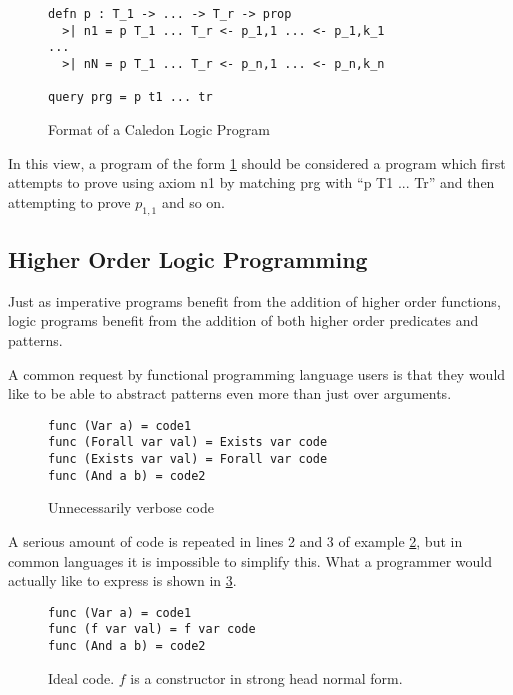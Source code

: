 \begin{figure}[H]
\begin{lstlisting}
defn p : T_1 -> ... -> T_r -> prop
  >| n1 = p T_1 ... T_r <- p_1,1 ... <- p_1,k_1
...
  >| nN = p T_1 ... T_r <- p_n,1 ... <- p_n,k_n

query prg = p t1 ... tr
\end{lstlisting}
\caption{Format of a Caledon Logic Program}
\label{code:format}
\end{figure}

In this view, a program of the form \ref{code:format}
should be considered a program which first attempts to prove using axiom n1 by matching prg with ``p T1 ... Tr'' and then
attempting to prove $p_{1,1}$ and so on.


\FloatBarrier
\subsection{Higher Order Logic Programming}

Just as imperative programs benefit from the addition of higher order functions, logic programs benefit from the addition of both
higher order predicates and patterns.  

A common request by functional programming language users is that they would like to be able to abstract patterns even more than just over
arguments.  

\begin{figure}[H]
\begin{lstlisting}
func (Var a) = code1
func (Forall var val) = Exists var code
func (Exists var val) = Forall var code
func (And a b) = code2
\end{lstlisting}
\caption{Unnecessarily verbose code}
\label{code:verbose}
\end{figure}

A serious amount of code is repeated in lines 2 and 3 of example \ref{code:verbose}, 
but in common languages it is impossible to simplify this.
What a programmer would actually like to express is shown in \ref{code:Fideal}.

\begin{figure}[H]
\begin{lstlisting}
func (Var a) = code1
func (f var val) = f var code
func (And a b) = code2
\end{lstlisting}
\caption{Ideal code. $f$ is a constructor in strong head normal form.}
\label{code:Fideal}
\end{figure}

